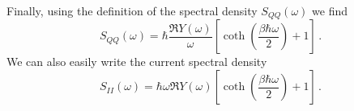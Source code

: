 Finally, using the definition of the spectral density $S_{QQ}(\omega)$ we find
\begin{equation}
S_{QQ}(\omega) = \hbar \frac{\Re Y(\omega)}{\omega} \left[ \coth \left( \frac{\beta \hbar \omega}{2} \right) + 1 \right] \, .
\end{equation}
We can also easily write the current spectral density
\begin{equation}
S_{II}(\omega) = \hbar \omega \Re Y(\omega) \left[ \coth \left( \frac{\beta \hbar \omega}{2} \right) + 1 \right] \, . \label{eq:ch.decoherence.sec.correlation_functions:S_II}
\end{equation}

